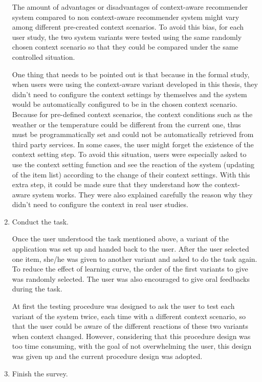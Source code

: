 \begin{enumerate}
The amount of advantages or disadvantages of context-aware recommender system compared to non context-aware recommender system might vary among different pre-created context scenarios. To avoid this bias, for each user study, the two system variants were tested using the same randomly chosen context scenario so that they could be compared under the same controlled situation. 

One thing that needs to be pointed out is that because in the formal study, when users were using the context-aware variant developed in this thesis, they didn't need to configure the context settings by themselves and the system would be automatically configured to be in the chosen context scenario. Because for pre-defined context scenarios, the context conditions such as the weather or the temperature could be different from the current one, thus must be programmatically set and could not be automatically retrieved from third party services. In some cases, the user might forget the existence of the context setting step. To avoid this situation, users were especially asked to use the context setting function and see the reaction of the system (updating of the item list) according to the change of their context settings. With this extra step, it could be made sure that they understand how the context-aware system works. They were also explained carefully the reason why they didn't need to configure the context in real user studies.

\item{Conduct the task.}

Once the user understood the task mentioned above, a variant of the application was set up and handed back to the user. After the user selected one item, she/he was given to another variant and asked to do the task again. To reduce the effect of learning curve, the order of the first variants to give was randomly selected. The user was also encouraged to give oral feedbacks during the task. 

At first the testing procedure was designed to ask the user to test each variant of the system twice, each time with a different context scenario, so that the user could be aware of the different reactions of these two variants when context changed. However, considering that this procedure design was too time consuming, with the goal of not overwhelming the user, this design was given up and the current procedure design was adopted.

\item{Finish the survey.}


\end{enumerate}
